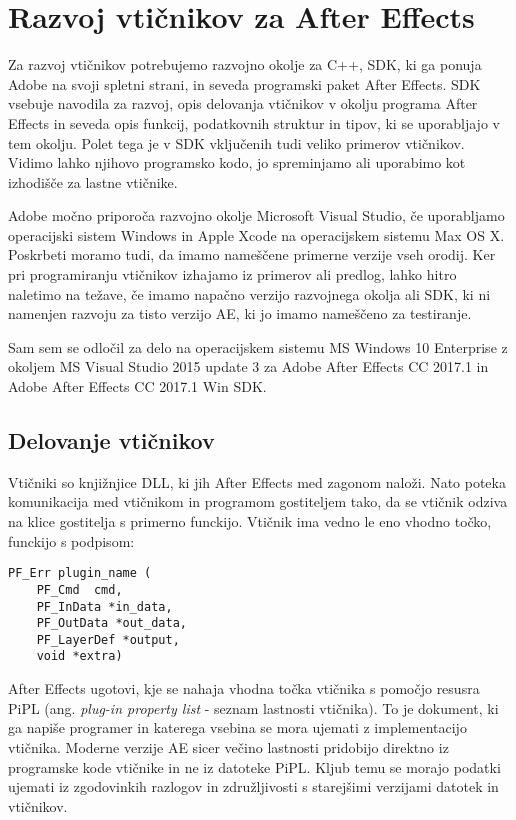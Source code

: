 \documentclass[a4paper, 12pt]{book}
\begin{document}
\chapter{Razvoj vtičnikov za After Effects}

Za razvoj vtičnikov potrebujemo razvojno okolje za C++, SDK, ki ga ponuja Adobe na svoji spletni strani, in seveda programski paket After Effects. 
SDK vsebuje navodila za razvoj, opis delovanja vtičnikov v okolju programa After Effects in seveda opis funkcij, podatkovnih struktur in tipov, ki se uporabljajo v tem okolju. 
Polet tega je v SDK vključenih tudi veliko primerov vtičnikov. 
Vidimo lahko njihovo programsko kodo, jo spreminjamo ali uporabimo kot izhodišče za lastne vtičnike.

Adobe močno priporoča razvojno okolje Microsoft Visual Studio, če uporabljamo operacijski sistem Windows in Apple Xcode na operacijskem sistemu Max OS X. 
Poskrbeti moramo tudi, da imamo nameščene primerne verzije vseh orodij. 
Ker pri programiranju vtičnikov izhajamo iz primerov ali predlog, lahko hitro naletimo na težave, če imamo napačno verzijo razvojnega okolja ali SDK, ki ni namenjen razvoju za tisto verzijo AE, ki jo imamo nameščeno za testiranje.

Sam sem se odločil za delo na operacijskem sistemu MS Windows 10 Enterprise z okoljem MS Visual Studio 2015 update 3 za Adobe After Effects CC 2017.1 in Adobe After Effects CC 2017.1 Win SDK. 


\section{Delovanje vtičnikov}
Vtičniki so knjižnjice DLL, ki jih After Effects med zagonom naloži. 
Nato poteka komunikacija med vtičnikom in programom gostiteljem tako, da se vtičnik odziva na klice gostitelja s primerno funckijo. 
Vtičnik ima vedno le eno vhodno točko, funckijo s podpisom:
\begin{verbatim}
PF_Err plugin_name (
    PF_Cmd	cmd,
    PF_InData *in_data,
    PF_OutData *out_data,
    PF_LayerDef *output,
    void *extra)
\end{verbatim}

After Effects ugotovi, kje se nahaja vhodna točka vtičnika s pomočjo resusra PiPL (ang. {\it plug-in property list} - seznam lastnosti vtičnika).
To je dokument, ki ga napiše programer in katerega vsebina se mora ujemati z implementacijo vtičnika. 
Moderne verzije AE sicer večino lastnosti pridobijo direktno iz programske kode vtičnike in ne iz datoteke PiPL. 
Kljub temu se morajo podatki ujemati iz zgodovinkih razlogov in združljivosti s starejšimi verzijami datotek in vtičnikov. 
\end{document}
